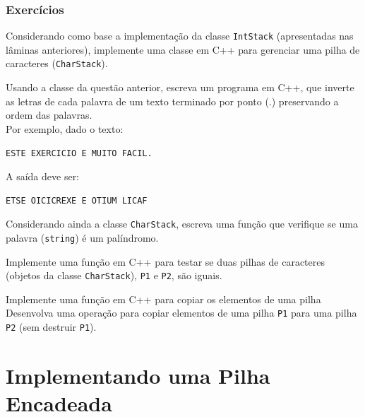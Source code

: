 \documentclass[aspectratio=169]{beamer}
\begin{document}
\begin{frame}[fragile]\frametitle{Exercícios}
\begin{enumerate}
{\small
	\item Considerando como base a implementação da classe \texttt{IntStack} (apresentadas nas lâminas anteriores), implemente uma classe em C++ para gerenciar uma pilha de caracteres (\texttt{CharStack}).
	\item Usando a classe da questão anterior, escreva um programa em C++, que inverte as letras de cada palavra de um texto terminado por ponto (.) preservando a ordem das palavras.\\
Por exemplo, dado o texto:\\
\begin{verbatim}
ESTE EXERCICIO E MUITO FACIL.
\end{verbatim}
A saída deve ser:
\begin{verbatim}
ETSE OICICREXE E OTIUM LICAF
\end{verbatim}
\item Considerando ainda a classe \texttt{CharStack}, escreva uma função que verifique se uma palavra (\texttt{string}) é um palíndromo.
\item Implemente uma função em C++ para testar se duas pilhas de caracteres (objetos da classe \texttt{CharStack}), \texttt{P1} e \texttt{P2}, são iguais.
\item Implemente uma função em C++ para copiar os elementos de uma pilha Desenvolva uma operação para copiar elementos de uma pilha \texttt{P1} para uma pilha \texttt{P2} (sem destruir \texttt{P1}).
}
\end{enumerate}
\end{frame}

\section{Implementando uma Pilha Encadeada}
\end{document}
